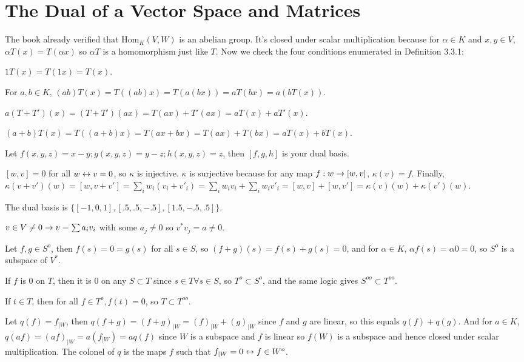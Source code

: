 \documentclass[11pt, oneside]{article}   	%
\begin{document}
\section{The Dual of a Vector Space and Matrices}
\be
\item The book already verified that $\text{Hom}_K(V, W)$ is an abelian group. It's closed under scalar multiplication because for $\alpha \in K$ and $x, y \in V$, $\alpha T(x) = T(\alpha x)$ so $\alpha T$ is a homomorphism just like $T$. Now we check the four conditions enumerated in Definition 3.3.1: \be
\item $1T(x) = T(1x) = T(x)$. 
\item For $a, b \in K$, $(ab)T(x) = T((ab)x) = T(a(bx)) = aT(bx) = a(bT(x))$.
\item $a(T + T')(x) = (T+T')(ax) = T(ax) + T'(ax) = aT(x) + aT'(x)$.
\item $(a + b)T(x) = T((a + b)x) = T(ax + bx) = T(ax) + T(bx) = aT(x) + bT(x)$.
\ee
\item Let $f(x, y, z) = x - y; g(x, y, z) = y -z; h(x, y, z) = z$, then $[f, g, h]$ is your dual basis.
\item $[w, v] = 0$ for all $w \leftrightarrow v = 0$, so $\kappa$ is injective. $\kappa$ is surjective because for any map $f: w \rightarrow [w, v]$, $\kappa(v) = f$. Finally, $\kappa(v + v')(w) = [w, v + v'] = \sum_iw_i(v_i + v'_i) = \sum_iw_iv_i + \sum_iw_iv'_i = [w, v] + [w, v'] = \kappa(v)(w) + \kappa(v')(w).$
\item The dual basis is $\{[-1, 0, 1], [.5, .5, -.5], [1.5, -.5, .5]\}$.
\item $v \in V \not = 0 \rightarrow v = \sum a_iv_i$ with some $a_j \not = 0$ so $v^*v_j = a \not = 0$.
\item \be
\item Let $f, g \in S^o$, then $f(s) = 0 = g(s)$ for all $s \in S$, so $(f + g)(s) = f(s) + g(s) = 0$, and for $\alpha \in K$, $\alpha f(s) = \alpha 0 = 0$, so $S^o$ is a subspace of $V^*$.
\item If $f$ is 0 on $T$, then it is 0 on any $S \subset T$ since $s \in T \forall s \in S$, so $T^o \subset S^o$, and the same logic gives $S^{oo} \subset T^{oo}$.
\item If $t \in T$, then for all $f \in T^o, f(t) = 0$, so $T \subset T^{oo}$.
\ee
\item Let $q(f) = f_{|W}$, then $q(f + g) = (f + g)_{|W} = (f)_{|W} + (g)_{|W}$ since $f$ and $g$ are linear, so this equals $q(f) + q(g)$. And for $a \in K$, $q(af) = (af)_{|W} = a(f_{|W}) = aq(f)$ since $W$ is a subspace and $f$ is linear so $f(W)$ is a subspace and hence closed under scalar multiplication. The colonel of $q$ is the maps $f$ such that $f_{|W} = 0 \leftrightarrow f \in W^o$.
\end{document}

